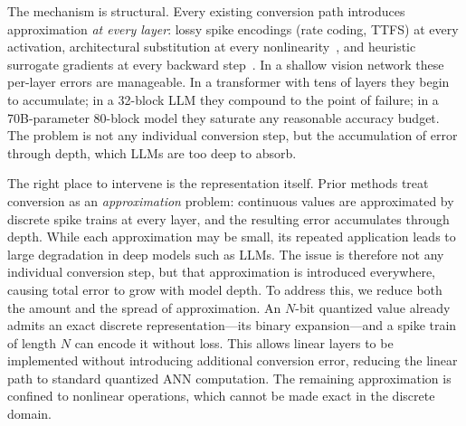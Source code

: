 \documentclass{article}
\theoremstyle{plain}
\theoremstyle{definition}
\theoremstyle{remark}
\begin{document}
The mechanism is structural. Every existing conversion path introduces
approximation \emph{at every layer}: lossy spike encodings (rate coding,
TTFS) at every activation, architectural substitution at every
nonlinearity~\citep{zhou2023spikformer,yao2023sdt,spikedattention2024}, and
heuristic surrogate gradients at every backward
step~\citep{neftci2019surrogate,shrestha2018slayer,deng2022tet}. In a shallow
vision network these per-layer errors are manageable. In a transformer with
tens of layers they begin to accumulate; in a 32-block LLM they compound to
the point of failure; in a 70B-parameter 80-block model they saturate any
reasonable accuracy budget. The problem is not any individual conversion step, but the accumulation of error through depth, which LLMs are too deep to absorb.

The right place to intervene is the representation itself. Prior methods treat conversion as an \emph{approximation} problem: continuous values are approximated by discrete spike trains at every layer, and the resulting error accumulates through depth. While each approximation may be small, its repeated application leads to large degradation in deep models such as LLMs. The issue is therefore not any individual conversion step, but that approximation is introduced everywhere, causing total error to grow with model depth.
%
To address this, we reduce both the amount and the spread of approximation. An $N$-bit quantized value already admits an exact discrete representation—its binary expansion—and a spike train of length $N$ can encode it without loss. This allows linear layers to be implemented without introducing additional conversion error, reducing the linear path to standard quantized ANN computation. The remaining approximation is confined to nonlinear operations, which cannot be made exact in the discrete domain.
\end{document}
